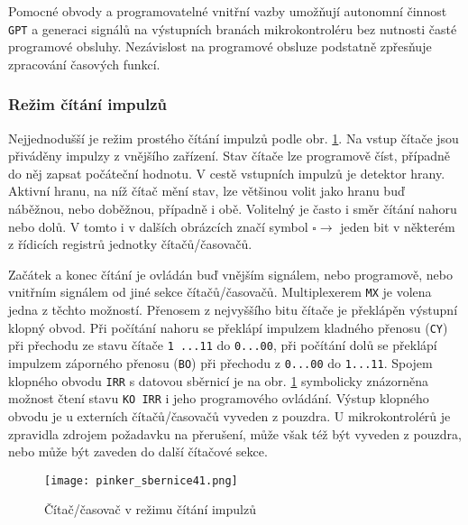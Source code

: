       Pomocné obvody a programovatelné vnitřní vazby umožňují autonomní činnost \texttt{GPT} a 
      generaci signálů na výstupních branách mikrokontroléru bez nutnosti časté programové obsluhy. 
      Nezávislost na programové obsluze podstatně zpřesňuje zpracování časových funkcí.
      
      \subsubsection{Režim čítání impulzů}
        Nejjednodušší je režim prostého čítání impulzů podle obr. \ref{MIT:fig_sbernice41}. Na 
        vstup čítače jsou přiváděny impulzy z vnějšího zařízení. Stav čítače lze programově číst, 
        případně do něj zapsat počáteční hodnotu. V cestě vstupních impulzů je detektor hrany. 
        Aktivní hranu, na níž čítač mění stav, lze většinou volit jako hranu buď náběžnou, nebo 
        doběžnou, případně i obě. Volitelný je často i směr čítání nahoru nebo dolů. V tomto i v 
        dalších obrázcích značí symbol \(\square\rightarrow\) jeden bit v některém z řídicích 
        registrů jednotky čítačů/časovačů.
        
        Začátek a konec čítání je ovládán buď vnějším signálem, nebo programově, nebo vnitřním 
        signálem od jiné sekce čítačů/časovačů. Multiplexerem \texttt{MX} je volena jedna z těchto 
        možností. Přenosem z nejvyššího bitu čítače je překlápěn výstupní klopný obvod. Při 
        počítání nahoru se překlápí impulzem kladného přenosu (\texttt{CY}) při přechodu ze stavu 
        čítače \texttt{1 ...11} do \texttt{0...00}, při počítání dolů se překlápí impulzem 
        záporného přenosu (\texttt{BO}) při přechodu z \texttt{0...00} do \texttt{1...11}. Spojem 
        klopného obvodu \texttt{IRR} s datovou sběrnicí je na obr. \ref{MIT:fig_sbernice41} 
        symbolicky znázorněna možnost čtení stavu \texttt{KO IRR} i jeho programového ovládání. 
        Výstup klopného obvodu je u externích čítačů/časovačů vyveden z pouzdra. U 
        mikrokontrolérů je zpravidla zdrojem požadavku na přerušení, může však též být vyveden z 
        pouzdra, nebo může být zaveden do další čítačové sekce.
        
        \begin{figure}[ht!] %
          \centering
          \texttt{[image: pinker\_sbernice41.png]}
          \caption{Čítač/časovač v režimu čítání impulzů}
          \label{MIT:fig_sbernice41}
        \end{figure}
        
